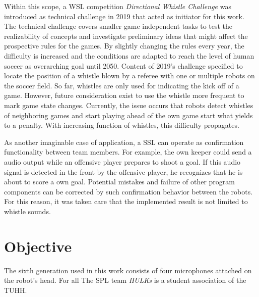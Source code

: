 Within this scope, a \acf{WSL} competition \textit{Directional Whistle Challenge} was
introduced as technical challenge in 2019 that acted as initiator for this work.
The technical challenge covers smaller game independent tasks to test the realizability of
concepts and investigate preliminary ideas that might affect the prospective rules for the games.
By slightly changing the rules every year, the difficulty is increased and the conditions
are adapted to reach the level of human soccer as overarching goal until 2050.
Content of 2019's challenge specified to locate the position of a whistle blown by a referee
with one or multiple robots on the soccer field.
So far, whistles are only used for indicating the kick off of a game.
However, future consideration exist to use the whistle more frequent
to mark game state changes.
Currently, the issue occurs that robots detect whistles of neighboring
games and start playing ahead of the own game start what yields to a penalty.
With increasing function of whistles, this difficulty propagates.

As another imaginable case of application, a \ac{SSL} can operate as confirmation
functionality between team members.
For example, the own keeper could send a audio output while an offensive player prepares
to shoot a goal.
If this audio signal is detected in the front by the offensive player, he recognizes
that he is about to score a own goal.
Potential mistakes and failure of other program components can be corrected by such
confirmation behavior between the robots.
For this reason, it was taken care that the implemented result is not limited to
whistle sounds.

\section{Objective}
\label{sec:01_objective}

The sixth generation used in this work consists of four microphones attached on
the robot's head.
For all 
The \ac{SPL} team \textit{HULKs} is a student association of the \ac{TUHH}.


